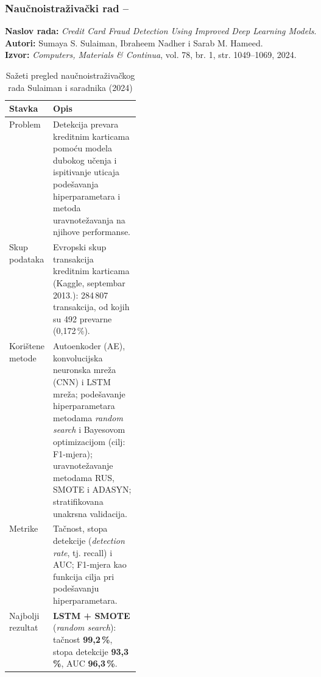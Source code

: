 \subsubsection*{Naučnoistraživački rad -- \ClanPet}

\textbf{Naslov rada:}
\emph{Credit Card Fraud Detection Using Improved Deep Learning Models}.\\

\textbf{Autori:}
Sumaya S. Sulaiman, Ibraheem Nadher i Sarab M. Hameed.\\

\textbf{Izvor:}
\emph{Computers, Materials \& Continua}, vol. 78, br. 1, str. 1049--1069,
2024. \cite{sulaiman2024fraud}

\begin{table}[H]
\centering
\caption{Sažeti pregled naučnoistraživačkog rada Sulaiman i saradnika (2024)}
\label{tab:sulaiman-pregled}
\small
\renewcommand{\arraystretch}{1.22}
\begin{tabularx}{\linewidth}{@{}p{0.25\linewidth}Y@{}}
\toprule
\textbf{Stavka} & \textbf{Opis} \\
\midrule

Problem &
Detekcija prevara kreditnim karticama pomoću modela dubokog učenja
i ispitivanje uticaja podešavanja hiperparametara i metoda
uravnotežavanja na njihove performanse. \\

Skup podataka &
Evropski skup transakcija kreditnim karticama (Kaggle, septembar 2013.):
284\,807 transakcija, od kojih su 492 prevarne (0,172\,\%). \\

Korištene metode &
Autoenkoder (AE), konvolucijska neuronska mreža (CNN) i LSTM mreža;
podešavanje hiperparametara metodama \emph{random search} i Bayesovom
optimizacijom (cilj: F1-mjera); uravnotežavanje metodama RUS, SMOTE
i ADASYN; stratifikovana unakrsna validacija. \\

Metrike &
Tačnost, stopa detekcije (\emph{detection rate}, tj. recall) i AUC;
F1-mjera kao funkcija cilja pri podešavanju hiperparametara. \\

Najbolji rezultat &
\textbf{LSTM + SMOTE} (\emph{random search}): tačnost \textbf{99,2\,\%},
stopa detekcije \textbf{93,3\,\%}, AUC \textbf{96,3\,\%}. \\

\bottomrule
\end{tabularx}
\end{table}
